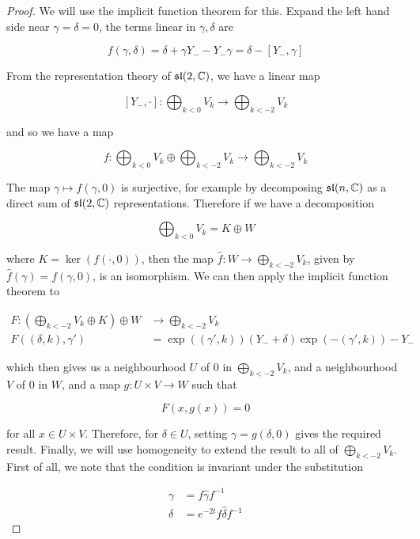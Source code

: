 \documentclass{report}
\renewcommand{\sl}{\mathfrak{sl}}
\begin{document}
\begin{proof}
    We will use the implicit function theorem for this. Expand the left hand side near \(\gamma = \delta = 0\), the terms linear in \(\gamma, \delta\) are

    \[f(\gamma, \delta) = \delta + \gamma Y_- - Y_-\gamma = \delta - [Y_-, \gamma]\]

    From the representation theory of \(\sl(2, \C)\), we have a linear map

    \[[Y_-, \cdot] : \bigoplus_{k < 0}V_k \to \bigoplus_{k < -2}V_k\]
    
    and so we have a map 

    \[f : \bigoplus_{k < 0}V_k \oplus \bigoplus_{k < -2}V_k \to \bigoplus_{k < -2}V_k\]
    
    The map \(\gamma \mapsto f(\gamma, 0)\) is surjective, for example by decomposing \(\sl(n, \C)\) as a direct sum of \(\sl(2, \C)\) representations. Therefore if we have a decomposition

    \[\bigoplus_{k < 0}V_k = K \oplus W\]

    where \(K = \ker(f(\cdot, 0))\), then the map \(\hat f : W \to \bigoplus\limits_{k < -2}V_k\), given by \(\hat f(\gamma) = f(\gamma, 0)\), is an isomorphism. We can then apply the implicit function theorem to

    \begin{align*}
        F : \left(\bigoplus_{k < -2}V_k \oplus K\right) \oplus W &\to \bigoplus_{k < -2}V_k \\
        F((\delta, k), \gamma') &= \exp((\gamma', k))(Y_- + \delta)\exp(-(\gamma', k)) - Y_-
    \end{align*}

    which then gives us a neighbourhood \(U\) of \(0\) in \(\bigoplus\limits_{k < -2}V_k\), and a neighbourhood \(V\) of \(0\) in \(W\), and a map \(g : U \times V \to W\) such that

    \[F(x, g(x)) = 0\]

    for all \(x \in U \times V\). Therefore, for \(\delta \in U\), setting \(\gamma = g(\delta, 0)\) gives the required result. Finally, we will use homogeneity to extend the result to all of \(\bigoplus \limits_{k < -2}V_k\). First of all, we note that the condition is invariant under the substitution

    \begin{align*}
        \gamma &= f\hat\gamma f^{-1} \\
        \delta &= e^{-2t}f\hat\delta f^{-1}
    \end{align*}


\end{proof}
\end{document}
